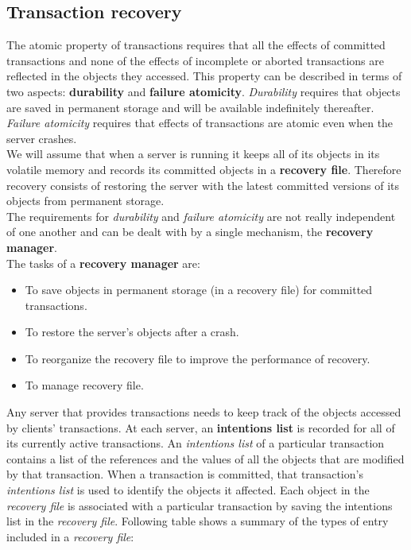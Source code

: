 \subsection{Transaction recovery}
The atomic property of transactions requires that all the effects of committed transactions and none of the effects of incomplete or aborted transactions are reflected in the objects they accessed. This property can be described in terms of two aspects: \textbf{durability} and \textbf{failure atomicity}. \textit{Durability} requires that objects are saved in permanent storage and will be available indefinitely thereafter. \textit{Failure atomicity} requires that effects of transactions are atomic even when the server crashes.\\
We will assume that when a server is running it keeps all of its objects in its volatile memory and records its committed objects in a \textbf{recovery file}. Therefore recovery consists of restoring the server with the latest committed versions of its objects from permanent storage.\\
The requirements for \textit{durability} and \textit{failure atomicity} are not really independent of one another and can be dealt with by a single mechanism, the \textbf{recovery manager}. \\
The tasks of a \textbf{recovery manager} are:
\begin{itemize}
	\item To save objects in permanent storage (in a recovery file) for committed
	transactions.
	\item To restore the server’s objects after a crash.
	\item To reorganize the recovery file to improve the performance of recovery.
	\item To manage recovery file.
\end{itemize}
Any server that provides transactions needs to keep track of the objects accessed by clients’ transactions. At each server, an \textbf{intentions list} is recorded for all of its currently active transactions. An \textit{intentions list} of a particular transaction contains a list of the references and the values of all the objects that are modified by that transaction. When a transaction is committed, that transaction’s \textit{intentions list} is used to identify the objects it affected. Each object in the \textit{recovery file} is associated with a particular transaction by saving the intentions list in the
\textit{recovery file}. Following table shows a summary of the types of entry included in a \textit{recovery file}:
